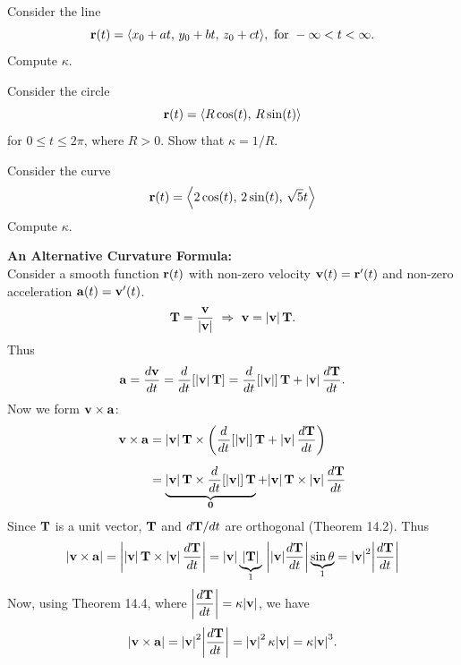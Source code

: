 \documentclass[mathNotesPreamble]{subfiles}
\begin{document}
  \begin{ex*}
    Consider the line
      \[\vecr(t)=\bracket{x_0+at,\,y_0+bt,\,z_0+ct},\textnormal{ for }-\infty<t<\infty.\]
    Compute $\kappa$.
  \end{ex*}

  \pagebreak

  \begin{ex*}
    Consider the circle
      \[\vecr(t)=\bracket{R\cos(t),\,R\sin(t)}\]
    for $0\leq t\leq 2\pi$, where $R>0$. Show that $\kappa=1/R$.
  \end{ex*}

  \begin{ex*}
    Consider the curve
      \[\vecr(t)=\bracket{2\cos(t),\,2\sin(t),\,\sqrt{5}t}\]
    Compute $\kappa$.
  \end{ex*}

  \pagebreak
  \textbf{An Alternative Curvature Formula:}\\
  Consider a smooth function $\vecr(t)$ with non-zero velocity $\vecv(t)=\vecr'(t)$ and non-zero acceleration $\veca(t)=\vecv'(t)$. 
    \[\vecT=\frac{\vecv}{\abs{\vecv}}\ \Rightarrow\   \vecv=\abs{\vecv}\,\vecT.\]
  Thus
    \[\veca=\frac{d\vecv}{dt}=\ddt\sbrkt{\abs{\vecv}\,\vecT}=\ddt\sbrkt{\abs{\vecv}}\,\vecT+\abs{\vecv}\,\frac{d\vecT}{dt}.\]
  Now we form $\vecv\times\veca$:
  \begin{align*}
    \vecv\times\veca&=\abs{\vecv}\,\vecT\times\parens{\ddt\sbrkt{\abs{\vecv}}\,\vecT+\abs{\vecv}\,\frac{d\vecT}{dt}}\\[5pt]
      &=\underbrace{\abs{\vecv}\,\vecT\times\ddt\sbrkt{\abs{\vecv}}\,\vecT}_{\bfO}+\abs{\vecv}\,\vecT\times\abs{\vecv}\,\frac{d\vecT}{dt}
  \end{align*}
  Since $\vecT$ is a unit vector, $\vecT$ and $d\vecT/dt$ are orthogonal (Theorem 14.2). Thus
  \begin{align*}
    \abs{\vecv\times\veca}=\abs{\abs{\vecv}\,\vecT\times\abs{\vecv}\,\frac{d\vecT}{dt}}=\abs{\vecv}\underbrace{\abs{\vecT}}_1\,\abs{\abs{\vecv}\frac{d\vecT}{dt}}\underbrace{\sin\theta}_1
      =\abs{\vecv}^2 \abs{\frac{d\vecT}{dt}}
  \end{align*}
  Now, using Theorem 14.4, where $\ds\abs{\frac{d\vecT}{dt}}=\kappa \abs{\vecv}$, we have
    \[\abs{\vecv\times\veca}=\abs{\vecv}^2\abs{\frac{d\vecT}{dt}}=\abs{\vecv}^2\,\kappa\abs{\vecv}=\kappa\abs{\vecv}^3.\]

  \noindent
\end{document}
